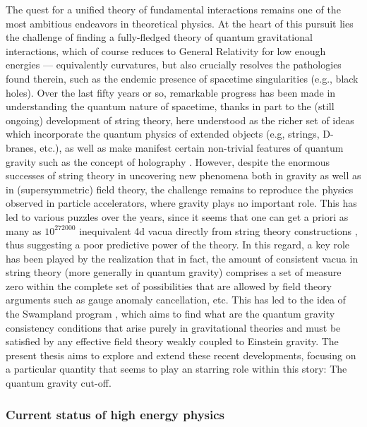 \thispagestyle{simple}

The quest for a unified theory of fundamental interactions remains one of the most ambitious endeavors in theoretical physics. At the heart of this pursuit lies the challenge of finding a fully-fledged theory of quantum gravitational interactions, which of course reduces to General Relativity \cite{EinsteinGR} for low enough energies --- equivalently curvatures, but also crucially resolves the pathologies found therein, such as the endemic presence of spacetime singularities (e.g., black holes). Over the last fifty years or so, remarkable progress has been made in understanding the quantum nature of spacetime, thanks in part to the (still ongoing) development of string theory, here understood as the richer set of ideas which incorporate the quantum physics of extended objects (e.g, strings, D-branes, etc.), as well as make manifest certain non-trivial features of quantum gravity such as the concept of holography \cite{Maldacena:1997re,Witten:1998qj}. However, despite the enormous successes of string theory in uncovering new phenomena both in gravity as well as in (supersymmetric) field theory, the challenge remains to reproduce the physics observed in particle accelerators, where gravity plays no important role. This has led to various puzzles over the years, since it seems that one can get a priori as many as $10^{272000}$ inequivalent 4d vacua directly from string theory constructions \cite{Taylor:2015xtz}, thus suggesting a poor predictive power of the theory. In this regard, a key role has been played by the realization that in fact, the amount of consistent vacua in string theory (more generally in quantum gravity) comprises a set of measure zero within the complete set of possibilities that are allowed by field theory arguments such as gauge anomaly cancellation, etc. This has led to the idea of the Swampland program \cite{Vafa:2005ui}, which aims to find what are the quantum gravity consistency conditions that arise purely in gravitational theories and must be satisfied by any effective field theory weakly coupled to Einstein gravity. The present thesis aims to explore and extend these recent developments, focusing on a particular quantity that seems to play an starring role within this story: The quantum gravity cut-off.

\subsubsection*{Current status of high energy physics}

